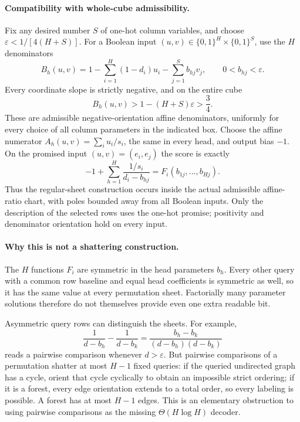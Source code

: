 \documentclass[11pt]{article}
\begin{document}
\paragraph{Compatibility with whole-cube admissibility.}
Fix any desired number $S$ of one-hot column variables, and choose
$\varepsilon<1/[4(H+S)]$. For a Boolean input
$(u,v)\in\{0,1\}^H\times\{0,1\}^S$, use the $H$ denominators
\[
 B_h(u,v)=1-\sum_{i=1}^H(1-d_i)u_i
             -\sum_{j=1}^S b_{hj}v_j,
 \qquad 0<b_{hj}<\varepsilon.
\]
Every coordinate slope is strictly negative, and on the entire cube
\[
 B_h(u,v)>1-(H+S)\varepsilon>\frac34.
\]
These are admissible negative-orientation affine denominators, uniformly
for every choice of all column parameters in the indicated box.
Choose the affine numerator
$A_h(u,v)=\sum_i u_i/s_i$, the same in every head, and output bias
$-1$. On the promised input $(u,v)=(e_i,e_j)$ the score is exactly
\[
 -1+\sum_{h=1}^H\frac{1/s_i}{d_i-b_{hj}}=F_i(b_{1j},\ldots,b_{Hj}).
\]
Thus the regular-sheet construction occurs inside the actual admissible
affine-ratio chart, with poles bounded away from all Boolean inputs.
Only the description of the selected rows uses the one-hot promise;
positivity and denominator orientation hold on every input.

\paragraph{Why this is not a shattering construction.}
The $H$ functions $F_i$ are symmetric in the head parameters $b_h$.
Every other query with a common row baseline and equal head coefficients
is symmetric as well, so it has the same value at every permutation
sheet. Factorially many parameter solutions therefore do not themselves
provide even one extra readable bit.

Asymmetric query rows can distinguish the sheets. For example,
\[
 \frac1{d-b_h}-\frac1{d-b_k}
 =\frac{b_h-b_k}{(d-b_h)(d-b_k)}
\]
reads a pairwise comparison whenever $d>\varepsilon$. But pairwise
comparisons of a permutation shatter at most $H-1$ fixed queries:
if the queried undirected graph has a cycle, orient that cycle
cyclically to obtain an impossible strict ordering; if it is a forest,
every edge orientation extends to a total order, so every labeling is
possible. A forest has at most $H-1$ edges. This is an elementary
obstruction to using pairwise comparisons as the missing
$\Theta(H\log H)$ decoder.
\end{document}
